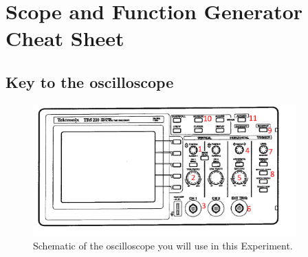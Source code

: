 \newpage

\section*{Scope and Function Generator Cheat Sheet}

\subsection*{Key to the oscilloscope}

\begin{figure}[h!]
        \centering
            \includegraphics[width=0.9\textwidth]{./Exp9/pic/scope_label.pdf}
        \caption{Schematic of the oscilloscope you will use in this Experiment.}
        \label{fig:osc}
\end{figure}

